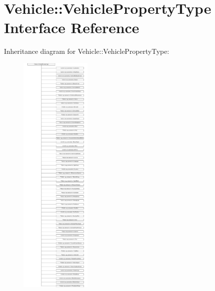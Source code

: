 \hypertarget{interfaceVehicle_1_1VehiclePropertyType}{\section{Vehicle\-:\-:Vehicle\-Property\-Type Interface Reference}
\label{interfaceVehicle_1_1VehiclePropertyType}
}
Inheritance diagram for Vehicle\-:\-:Vehicle\-Property\-Type\-:\begin{figure}[H]
\begin{center}
\leavevmode
\includegraphics[height=12.000000cm]{interfaceVehicle_1_1VehiclePropertyType}
\end{center}
\end{figure}
